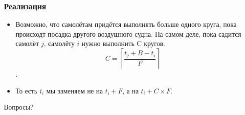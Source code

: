 \begin{frame}
    \frametitle{Реализация}

    \begin{itemize}
        \item Возможно, что самолётам придётся выполнять больше одного круга, пока происходт посадка другого воздушного судна. На самом деле, пока садится самолёт $j$, самолёту $i$ нужно выполнить C кругов. 
        $$ C = \left\lceil \frac{t_j + B - t_i}{F} \right\rceil$$.
        \item То есть $t_i$ мы заменяем не на $t_i + F$, а на $t_i + C\times{}F$.
    \end{itemize}
\end{frame}

\begin{frame}
    \begin{center}
        \Huge Вопросы?
    \end{center}
\end{frame}

